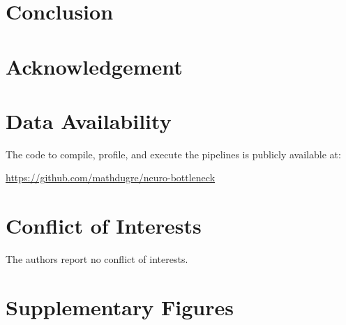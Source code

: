 \documentclass[conference]{IEEEtran}
\begin{document}

\section{Conclusion}

\section*{Acknowledgement}

\section*{Data Availability}
The code to compile, profile, and execute the pipelines is publicly available at:

\href{https://github.com/mathdugre/neuro-bottleneck}{https://github.com/mathdugre/neuro-bottleneck}

\section*{Conflict of Interests}
The authors report no conflict of interests.

\section*{Supplementary Figures}


% 

\end{document}

